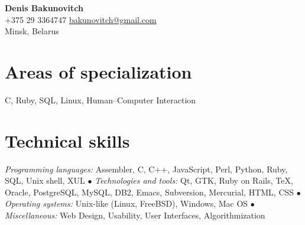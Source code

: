 \documentclass[12pt, a4paper]{article}
\begin{document}
\newlength{\rcollength}\setlength{\rcollength}{1.85in}%

\textbf{\Huge Denis Bakunovitch}\\
+375 29 3364747 \hfill \href{mailto:bakunovitch@gmail.com}{bakunovitch@gmail.com}\\
Minsk, Belarus\\
\quad\pagebreak[2]
\hrulefill

\section*{Areas of specialization}
C, Ruby, SQL, Linux, Human--Computer Interaction

\section*{Technical skills}
\textit{Programming languages:} Assembler, C, C++, JavaScript, Perl, Python, Ruby, SQL, Unix
shell, XUL $\bullet$
\textit{Technologies and tools:} Qt, GTK, Ruby on Rails, \TeX, Oracle, PostgreSQL,
MySQL, DB2, Emacs, Subversion, Mercurial, HTML, CSS $\bullet$
\textit{Operating systems:} Unix-like (Linux, FreeBSD), Windows, Mac
OS $\bullet$
\textit{Miscellaneous:} Web Design, Usability, User Interfaces,
Algorithmization
\end{document}
